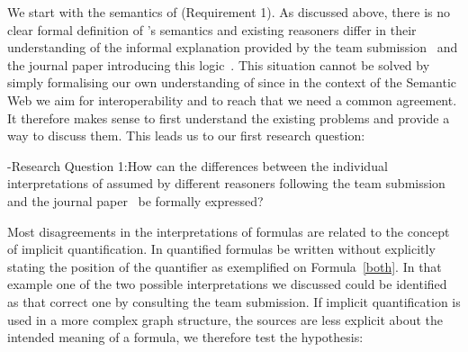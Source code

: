 We start with the semantics of \nthree (Requirement 1).  As discussed above, there is no clear formal definition of \nthree's semantics and existing \nthree reasoners
differ in their understanding of the informal explanation provided by the \wwwc team submission~\cite{Notation3} and the journal paper introducing this logic~\cite{N3Logic}. 
This situation cannot be solved by simply formalising our own understanding of \nthreelogic since in the context of the Semantic Web 
we aim for interoperability and to reach that we need a 
common agreement. It therefore makes sense to first understand the existing problems and provide a way to discuss them. This leads us to our first research question:

\hyp{\hypertarget{rq2}{Research Question 1:}}{How can the differences between the individual interpretations of \nthree assumed by different reasoners 
following the \wwwc team submission~\cite{Notation3}
and the journal paper~\cite{N3Logic}
 be formally expressed?}

Most disagreements in the interpretations of \nthree formulas are related to 
the concept of implicit quantification. 
In \nthree quantified 
formulas be written without explicitly stating the position of the quantifier as exemplified on Formula~\ref{both}. In that example one of the two possible interpretations we 
discussed could be identified as that correct one by consulting the \wwwc team submission. If implicit quantification is used in a more complex graph structure, the sources are less 
explicit about the intended meaning of a formula, we therefore test the hypothesis:

